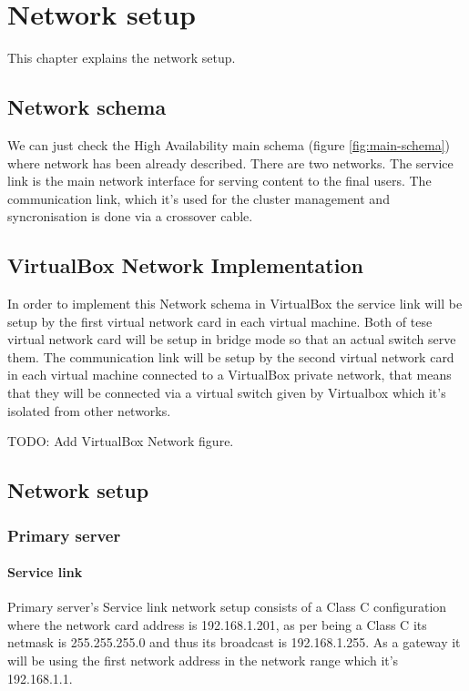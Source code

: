 

\chapter{Network setup}
This chapter explains the network setup.

\section {Network schema}
We can just check the High Availability main schema (figure \ref{fig:main-schema}) where network has been already described. There are two networks. The service link is the main network interface for serving content to the final users. The communication link, which it's used for the cluster management and syncronisation is done via a crossover cable.

\section {VirtualBox Network Implementation}

In order to implement this Network schema in VirtualBox the service link will be setup by the first virtual network card in each virtual machine. Both of tese virtual network card will be setup in bridge mode so that an actual switch serve them. The communication link will be setup by the second virtual network card in each virtual machine connected to a VirtualBox private network, that means that they will be connected via a virtual switch given by Virtualbox which it's isolated from other networks.

TODO: Add VirtualBox Network figure.

\section {Network setup}

\subsection {Primary server}
\subsubsection {Service link}
Primary server's Service link network setup consists of a Class C configuration where the network card address is 192.168.1.201, as per being a Class C its netmask is 255.255.255.0 and thus its broadcast is 192.168.1.255. As a gateway it will be using the first network address in the network range which it's 192.168.1.1.

